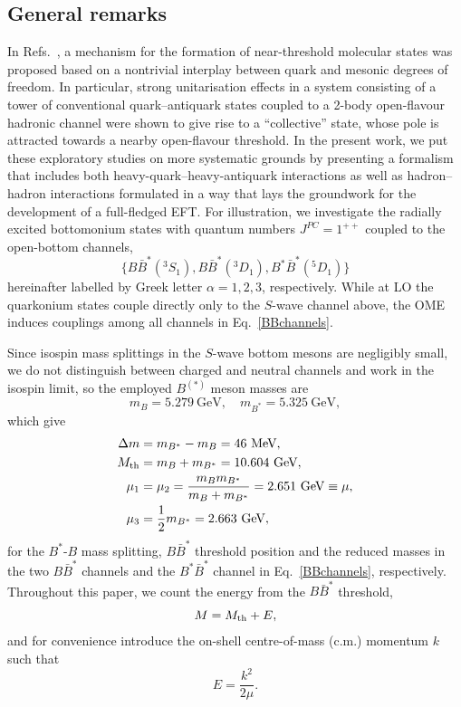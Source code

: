 \documentclass[aps,prd,showpacs,amsmath,twocolumn,superscriptaddress,floatfix,nofootinbib,notitlepage]{revtex4-2}
\newcommand{\be}{\begin{equation}}
\newcommand{\ee}{\end{equation}}
\begin{document}
\subsection{General remarks}
\label{sec:remarks}

In Refs.~\cite{Hammer:2016prh,Hanhart:2022qxq}, a mechanism for the formation of near-threshold molecular states was proposed based on a nontrivial interplay between quark and mesonic degrees of freedom. In particular, strong unitarisation effects in a system consisting of a tower of conventional quark--antiquark states coupled to a 2-body open-flavour hadronic channel were shown to give rise to a ``collective'' state, whose pole is attracted towards a nearby open-flavour threshold.
In the present work, we put these exploratory studies on more systematic grounds by presenting a formalism that includes both heavy-quark--heavy-antiquark interactions as well as hadron--hadron interactions formulated in a way 
that lays the groundwork for the development of a full-fledged EFT. 
For illustration, we investigate the radially excited bottomonium states with quantum numbers $J^{PC}=1^{++}$ coupled to the open-bottom channels,
\be
\{B\bar{B}^*(^3S_1),B\bar{B}^*(^3D_1),B^*\bar{B}^*(^5D_1)\}
\label{BBchannels}
\ee
hereinafter labelled by Greek letter $\alpha=1,2,3$, respectively.
While at LO the quarkonium states couple directly only to the $S$-wave channel above, the OME induces couplings among all channels in Eq.~\eqref{BBchannels}.

Since isospin mass splittings in the $S$-wave bottom mesons are negligibly small, we do not distinguish between charged and neutral channels and work in the isospin limit, so the employed $B^{(*)}$ meson masses are
\be
m_B=5.279~\mbox{GeV},\quad m_{B^*}=5.325~\mbox{GeV},
\label{mBBst}
\ee
which give 
\be
\begin{split} 
\Delta m&=m_{B^*}-m_B=46~\mbox{MeV},\\
M_{\rm th}&=m_B+m_{B^*}=10.604~\mbox{GeV},\\
\mu_1&=\mu_2=\frac{m_Bm_{B^*}}{m_B+m_{B^*}}=2.651~\mbox{\rm GeV}\equiv\mu,\\
\mu_3&=\frac12 m_{B^*}=2.663~\mbox{\rm GeV},
\label{mthmu}
\end{split}
\ee
for the $B^*$-$B$ mass splitting, $B\bar{B}^*$ threshold position and the reduced masses in the two $B\bar{B}^*$ channels and the $B^*\bar{B}^*$ channel in Eq.~\eqref{BBchannels}, respectively.
Throughout this paper, we count the energy from the $B\bar{B}^*$ threshold,
\be
M=M_{\rm th}+E,
\label{energyth}
\ee
and for convenience introduce the on-shell centre-of-mass (c.m.) momentum $k$ such that
\be
E=\frac{k^2}{2\mu}.
\label{kdef}
\ee
\end{document}

